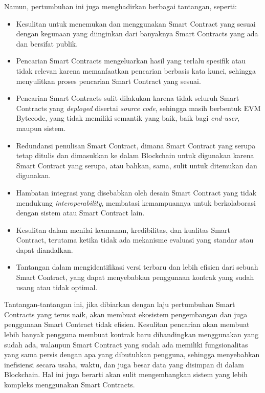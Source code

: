 Namun, pertumbuhan ini juga menghadirkan berbagai tantangan, seperti:
\begin{itemize}
    \item Kesulitan untuk menemukan dan menggunakan Smart Contract yang sesuai dengan kegunaan yang diinginkan dari banyaknya Smart Contracts yang ada dan bersifat publik.
    \item Pencarian Smart Contracts mengeluarkan hasil yang terlalu spesifik atau tidak relevan karena memanfaatkan pencarian berbasis kata kunci, sehingga menyulitkan proses pencarian Smart Contract yang sesuai.
    \item Pencarian Smart Contracts sulit dilakukan karena tidak seluruh Smart Contracts yang \textit{deployed} disertai \textit{source code}, sehingga masih berbentuk EVM Bytecode, yang tidak memiliki semantik yang baik, baik bagi \textit{end-user}, maupun sistem. 
    \item Redundansi penulisan Smart Contract, dimana Smart Contract yang serupa tetap ditulis dan dimasukkan ke dalam Blockchain untuk digunakan karena Smart Contract yang serupa, atau bahkan, sama, sulit untuk ditemukan dan digunakan.
    \item Hambatan integrasi yang disebabkan oleh desain Smart Contract yang tidak mendukung \textit{interoperability}, membatasi kemampuannya untuk berkolaborasi dengan sistem atau Smart Contract lain.
    \item Kesulitan dalam menilai keamanan, kredibilitas, dan kualitas Smart Contract, terutama ketika tidak ada mekanisme evaluasi yang standar atau dapat diandalkan.
    \item Tantangan dalam mengidentifikasi versi terbaru dan lebih efisien dari sebuah Smart Contract, yang dapat menyebabkan penggunaan kontrak yang sudah usang atau tidak optimal.
\end{itemize}

Tantangan-tantangan ini, jika dibiarkan dengan laju pertumbuhan Smart Contracts yang terus naik, akan membuat ekosistem pengembangan dan juga penggunaan Smart Contract tidak efisien. Kesulitan pencarian akan membuat lebih banyak pengguna membuat kontrak baru dibandingkan menggunakan yang sudah ada, walaupun Smart Contract yang sudah ada memiliki fungsionalitas yang sama persis dengan apa yang dibutuhkan pengguna, sehingga menyebabkan inefisiensi secara usaha, waktu, dan juga besar data yang disimpan di dalam Blockchain. Hal ini juga berarti akan sulit mengembangkan sistem yang lebih kompleks menggunakan Smart Contracts.

